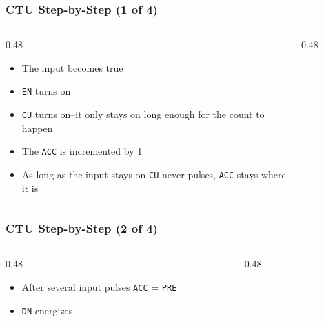 \begin{frame}
    \frametitle{CTU Step-by-Step (1 of 4)}

    \begin{columns}
        \begin{column}{0.48\linewidth}
            \begin{itemize}
                \item The input becomes true
                \item \texttt{EN} turns on
                \item \texttt{CU} turns on--it only stays on long enough for the count to happen
                \item The \texttt{ACC} is incremented by 1
                \item As long as the input stays on \texttt{CU} never pulses, \texttt{ACC} stays where it is
            \end{itemize}
        \end{column}
        \begin{column}{0.48\linewidth}
            \begin{figure}
                \centering
                \resizebox{\columnwidth}{!}{
                    
                }
            \end{figure}
        \end{column}
    \end{columns}
\end{frame}

\begin{frame}
    \frametitle{CTU Step-by-Step (2 of 4)}

    \begin{columns}
        \begin{column}{0.48\linewidth}
            \begin{itemize}
                \item After several input pulses \texttt{ACC} = \texttt{PRE}
                \item \texttt{DN} energizes
            \end{itemize}
        \end{column}
        \begin{column}{0.48\linewidth}
            \begin{figure}
                \centering
                \resizebox{\columnwidth}{!}{
                    
                }
            \end{figure}
        \end{column}
    \end{columns}
\end{frame}

